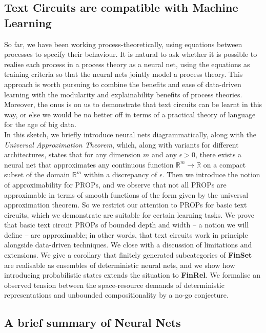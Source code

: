 \begin{fullwidth}

\section{Text Circuits are compatible with Machine Learning}

So far, we have been working process-theoretically, using equations between processes to specify their behaviour. It is natural to ask whether it is possible to realise each process in a process theory as a neural net, using the equations as training criteria so that the neural nets jointly model a process theory. This approach is worth pursuing to combine the benefits and ease of data-driven learning with the modularity and explainability benefits of process theories. Moreover, the onus is on us to demonstrate that text circuits can be learnt in this way, or else we would be no better off in terms of a practical theory of language for the age of big data.\\

In this sketch, we briefly introduce neural nets diagrammatically, along with the \emph{Universal Approximation Theorem}, which, along with variants for different architectures, states that for any dimension $m$ and any $\epsilon > 0$, there exists a neural net that approximates any continuous function $\mathbb{R}^m \rightarrow \mathbb{R}$ on a compact subset of the domain $\mathbb{R}^m$ within a discrepancy of $\epsilon$. Then we introduce the notion of approximability for PROPs, and we observe that not all PROPs are approximable in terms of smooth functions of the form given by the universal approximation theorem. So we restrict our attention to PROPs for basic text circuits, which we demonstrate are suitable for certain learning tasks. We prove that basic text circuit PROPs of bounded depth and width -- a notion we will define -- are approximable; in other words, that text circuits work in principle alongside data-driven techniques. We close with a discussion of limitations and extensions. We give a corollary that finitely generated subcategories of \textbf{FinSet} are realisable as ensembles of deterministic neural nets, and we show how introducing probabilistic states extends the situation to \textbf{FinRel}. We formalise an observed tension between the space-resource demands of deterministic representations and unbounded compositionality by a no-go conjecture.

\subsection{A brief summary of Neural Nets}


\end{fullwidth}

